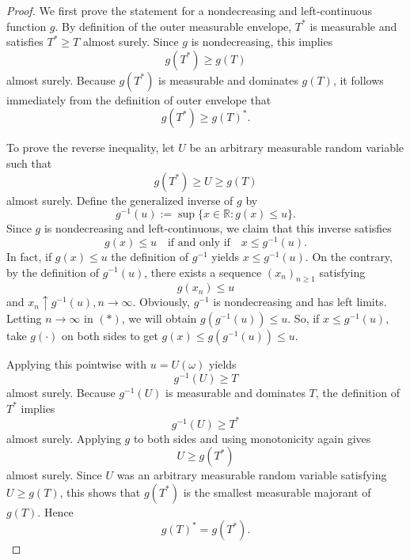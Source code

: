 \documentclass[12pt]{article}
\renewcommand{\(}{\left(}%
\renewcommand{\)}{\right)}%
\renewcommand{\[}{\left[}%
\renewcommand{\]}{\right]}%
\newtheorem{proof}{Proof.}}
\begin{document}
  \begin{proof}
We first prove the statement for a nondecreasing and left-continuous function $g$. By definition of the outer measurable envelope, $T^*$ is measurable and satisfies $T^*\ge T$ almost surely. Since $g$ is nondecreasing, this implies
\begin{equation*}
g(T^*) \ge g(T)
\end{equation*}
almost surely. Because $g(T^*)$ is measurable and dominates $g(T)$, it follows immediately from the definition of outer envelope that
\begin{equation*}
 g(T^*)\geq g(T)^*.
\end{equation*}

To prove the reverse inequality, let $U$ be an arbitrary measurable random variable such that
\begin{equation*}
g(T^*) \ge U \ge g(T)
\end{equation*}
almost surely. Define the generalized inverse of $g$ by
\begin{equation*}
g^{-1}(u) := \sup\{x\in\mathbb R : g(x)\le u\}.
\end{equation*}
Since $g$ is nondecreasing and left-continuous, we claim that this inverse satisfies
\begin{equation*}
g(x)\le u \quad\text{if and only if}\quad x\le g^{-1}(u).
\end{equation*}
In fact, if $g(x)\le u$ the definition of $g^{-1}$ yields $x\leq g^{-1}(u)$. On the contrary, by the definition of $g^{-1}(u)$, there exists a sequence $(x_n)_{n\geq 1}$ satisfying 
\begin{equation*}
	g(x_n)\leq u\tag{$*$}
\end{equation*}
 and $x_n\uparrow g^{-1}(u),n\to\infty$. Obviously, $g^{-1}$ is nondecreasing and has left limits. Letting $n\to\infty$ in $(*)$, we will obtain $g(g^{-1}(u))\leq u$. So, if $x\le g^{-1}(u)$, take $g(\cdot)$ on both sides to get $g(x)\leq g(g^{-1}(u))\leq u$.
 
 
Applying this pointwise with $u=U(\omega)$ yields
\begin{equation*}
g^{-1}(U) \ge T
\end{equation*}
almost surely. Because $g^{-1}(U)$ is measurable and dominates $T$, the definition of $T^*$ implies
\begin{equation*}
g^{-1}(U) \ge T^*
\end{equation*}
almost surely. Applying $g$ to both sides and using monotonicity again gives
\begin{equation*}
U \ge g(T^*)
\end{equation*}
almost surely. Since $U$ was an arbitrary measurable random variable satisfying $U\ge g(T)$, this shows that $g(T^*)$ is the smallest measurable majorant of $g(T)$. Hence
\begin{equation*}
g(T)^* = g(T^*).
\end{equation*}


\end{proof}
\end{document}
